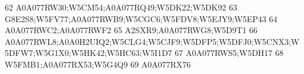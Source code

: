 \documentclass{beamer}
\begin{document}
\begin{frame}[fragile]
\begin{itemize}
\begin{Schunk}
\begin{Soutput}
62                                                                                                                                                                                                                                                                                                                                     A0A077RW30;W5CM54;A0A077RQ49;W5DK22;W5DK92
63                                                                                                                                                                                                                                                                                                                           G8E2S8;W5FV77;A0A077RWB9;W5CGC6;W5FDV8;W5EJY9;W5EP43
64                                                                                                                                                                                                                                                                                                                                                          A0A077RWC2;A0A077RWF2
65                                                                                                                                                                                                                                                                                                                                                       A2SXR9;A0A077RWG8;W5D9T1
66                                                                                                                                                                                                                                                                                    A0A077RWL8;A0A0H2UIQ2;W5CLG4;W5CJF9;W5DFP5;W5DFJ0;W5CNX3;W5DFW7;W5G1X0;W5HK42;W5HC63;W5I1D7
67                                                                                                                                                                                                                                                                                                                                                              A0A077RWS5;W5DH17
68                                                                                                                                                                                                                                                                                                                                                       W5FMB1;A0A077RX53;W5G4Q9
69                                                                                                                                                                                                                                                                                                                                                                     A0A077RX76

\end{Soutput}
\end{Schunk}
\end{itemize}
\end{frame}
\end{document}
